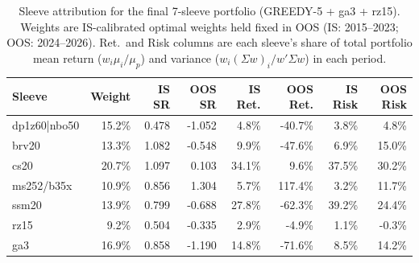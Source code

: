 \begin{table}[htbp]
    \centering
    \small
    \begin{tabular}{lrrrrrrr}
        \toprule
        Sleeve & Weight & IS SR & OOS SR & IS Ret. & OOS Ret. & IS Risk & OOS Risk \\
        \midrule
        dp1z60|nbo50 & 15.2\% &  0.478 & -1.052 &   4.8\% & -40.7\% &  3.8\% &  4.8\% \\
        brv20        & 13.3\% &  1.082 & -0.548 &   9.9\% & -47.6\% &  6.9\% & 15.0\% \\
        cs20         & 20.7\% &  1.097 &  0.103 &  34.1\% &   9.6\% & 37.5\% & 30.2\% \\
        ms252/b35x   & 10.9\% &  0.856 &  1.304 &   5.7\% & 117.4\% &  3.2\% & 11.7\% \\
        ssm20        & 13.9\% &  0.799 & -0.688 &  27.8\% & -62.3\% & 39.2\% & 24.4\% \\
        rz15         &  9.2\% &  0.504 & -0.335 &   2.9\% &  -4.9\% &  1.1\% & -0.3\% \\
        ga3          & 16.9\% &  0.858 & -1.190 &  14.8\% & -71.6\% &  8.5\% & 14.2\% \\
        \bottomrule
    \end{tabular}
    \caption{Sleeve attribution for the final 7-sleeve portfolio (GREEDY-5 + ga3 + rz15).
    Weights are IS-calibrated optimal weights held fixed in OOS (IS: 2015--2023; OOS: 2024--2026).
    Ret.\ and Risk columns are each sleeve's share of total portfolio mean return
    ($w_i \mu_i / \mu_p$) and variance ($w_i (\Sigma w)_i / w'\Sigma w$) in each period.}
    \label{tab:sleeve-attribution}
\end{table}
